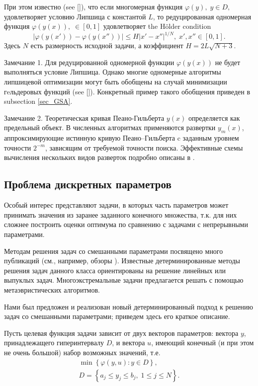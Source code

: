 \documentclass[preprint,12pt]{elsarticle}
\begin{document}
При этом известно (see []), что если многомерная функция $\varphi(y), \; y \in D,$  удовлетворяет условию Липшица с константой $L$, то редуцированная одномерная функция $\varphi(y(x)), \; \in [0,1]$ удовлетворяет the H{\"o}lder condition
\[
\left|\varphi(y(x'))-\varphi(y(x''))\right|\leq H\left|x'-x''\right|^{1/N}, \; x',x''\in[0,1].
\]
Здесь $N$ есть размерность исходной задачи, а коэффициент $ H=2 L \sqrt{N+3}$.

Замечание 1. Для редуцированной одномерной функции $\varphi(y(x))$  не будет выполняться условие Липшица. Однако многие одномерные алгоритмы липшицевой оптимизации
могут быть обобщены на случай минимизации гeльдеровых функций (see []). Конкретный пример такого обобщения приведен в subsection \ref{sec_GSA}. 

Замечание 2. Теоретическая кривая Пеано-Гильберта $y(x)$ определяется как предельный объект. В численных алгоритмах применяются развертки $y_m(x)$, аппроксимирующие истинную кривую Пеано–Гильберта c заданным уровнем точности $2^{-m}$, зависящим от требуемой точности поиска. Эффективные схемы вычисления нескольких видов разверток подробно описаны в \cite{Sergeyev2013}.


\subsection{Проблема дискретных параметров}
\label{sec_discr} 

Особый интерес представляют задачи, в которых часть параметров может принимать значения из заранее заданного конечного множества, т.к. для них сложнее построить оценки оптимума по сравнению с задачами с непрерывными параметрами.

Методам решения задач со смешанными параметрами посвящено много публикаций (см., например, обзоры \cite{Burer2012,Boukouvala2016}). 
Известные детерминированные методы решения задач данного класса ориентированы на решение линейных или выпуклых задач.
Многоэкстремальные задачи предлагается решать с помощью метаэвристических алгоритмов.

Нами был предложен и реализован новый детерминированный подход к решению задач со смешанными параметрами; приведем здесь его краткое описание. 

Пусть  целевая функция задачи зависит от двух векторов параметров: вектора $y$, принадлежащего гиперинтервалу $D$, и вектора $u$, имеющий конечный (и при этом не очень большой) набор возможных значений, т.е. 
\begin{gather}\label{problem_i}
\min{\left\{ \varphi(y,u) : y\in D \right\}},\\
D=\left\{a_j \leq y_j \leq b_j, \; 1\leq j \leq N \right\}.\nonumber
\end{gather}
\end{document}
